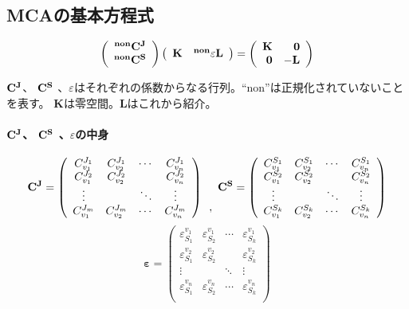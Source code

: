 \subsection{MCAの基本方程式}
\[
\left(
\begin{array}{c}
{\bf {}^{non}C^J}\\
{\bf {}^{non}C^S}
\end{array}
\right)
\left(
\begin{array}{cc}
{\bf K} & {\bf {}^{non}\varepsilon L}\\
\end{array}
\right)
=
\left(
\begin{array}{rr}
{\bf K} & {\bf 0}\\
{\bf 0} & {\bf -L}\\
\end{array}
\right)
\]

\({\bf C^J}\)、 \({\bf C^S}\) 、\({\varepsilon}\)はそれぞれの係数からなる行列。``non''は正規化されていないことを表す。
{\bf K}は零空間。{\bf L}はこれから紹介。

\paragraph{\({\bf C^J}\)、 \({\bf C^S}\) 、\({\varepsilon}\)の中身}
\[
{\bf C^J}
=
\left(
\begin{array}{cccc}
C^{J_1}_{v_1} & C^{J_1}_{v_2} & \cdots & C^{J_1}_{v_n} \\
C^{J_2}_{v_1} & C^{J_2}_{v_2} &        & C^{J_2}_{v_n} \\
\vdots       &              & \ddots & \vdots \\
C^{J_m}_{v_1} & C^{J_m}_{v_2} & \cdots & C^{J_m}_{v_n} \\
\end{array}
\right)
\begin{array}{c}
 \\
 \\
 \\
,\\
\end{array}
{\bf C^S}
=
\left(
\begin{array}{cccc}
C^{S_1}_{v_1} & C^{S_1}_{v_2} & \cdots & C^{S_1}_{v_n} \\
C^{S_2}_{v_1} & C^{S_2}_{v_2} &        & C^{S_2}_{v_n} \\
\vdots       &              & \ddots & \vdots \\
C^{S_k}_{v_1} & C^{S_k}_{v_2} & \cdots & C^{S_k}_{v_n} \\
\end{array}
\right)
\]
\[
{\boldsymbol \varepsilon}
=
\left(
\begin{array}{cccc}
\varepsilon^{v_1}_{S_1} & \varepsilon^{v_1}_{S_2} & \cdots & \varepsilon^{v_1}_{S_k} \\
\varepsilon^{v_2}_{S_1} & \varepsilon^{v_2}_{S_2} &        & \varepsilon^{v_2}_{S_k} \\
\vdots       &              & \ddots & \vdots \\
\varepsilon^{v_n}_{S_1} & \varepsilon^{v_n}_{S_2} & \cdots & \varepsilon^{v_n}_{S_k} \\
\end{array}
\right)
\]

